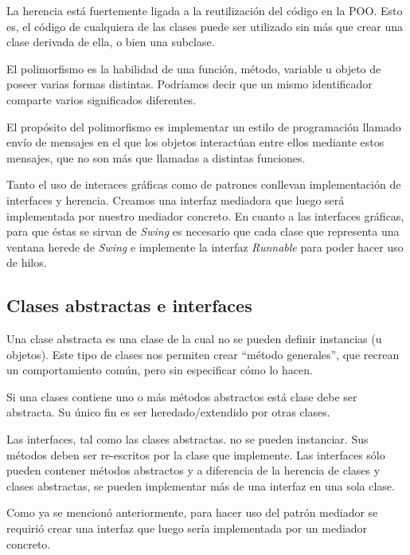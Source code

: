 \documentclass[12pt]{article}
\begin{document}
\par La herencia está fuertemente ligada a la reutilización del código en la POO. Esto es, el código de cualquiera de las clases puede ser utilizado sin más que crear una clase derivada de ella, o bien una subclase.

\par El polimorfismo es la habilidad de una función, método, variable u objeto de poseer varias formas distintas. Podríamos decir que un mismo identificador comparte varios significados diferentes.

\par El propósito del polimorfismo es implementar un estilo de programación llamado envío de mensajes en el que los objetos interactúan entre ellos mediante estos mensajes, que no son más que llamadas a distintas funciones.

\par Tanto el uso de interaces gráficas como de patrones conllevan implementación de interfaces y herencia. Creamos una interfaz mediadora que luego será implementada por nuestro mediador concreto. En cuanto a las interfaces gráficas, para que éstas se sirvan de \textit{Swing} es necesario que cada clase que representa una ventana herede de \textit{Swing} e implemente la interfaz \textit{Runnable} para poder hacer uso de hilos.

\subsection{Clases abstractas e interfaces}
Una clase abstracta es una clase de la cual no se pueden definir instancias (u objetos). Este tipo de clases nos permiten crear ``método generales'', que recrean un comportamiento común, pero sin especificar cómo lo hacen.

\par Si una clases contiene uno o más métodos abstractos está clase debe ser abstracta. Su único fin es ser heredado/extendido por otras clases.

\par Las interfaces, tal como las clases abstractas. no se pueden instanciar. Sus métodos deben ser re-escritos por la clase que implemente. Las interfaces sólo pueden contener métodos abstractos y a diferencia de la herencia de clases y clases abstractas, se pueden implementar más de una interfaz en una sola clase.

\par Como ya se mencionó anteriormente, para hacer uso del patrón mediador se requirió crear una interfaz que luego sería implementada por un mediador concreto. 
\end{document}
